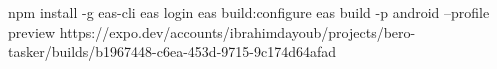 npm install -g eas-cli
eas login
eas build:configure
eas build -p android --profile preview
https://expo.dev/accounts/ibrahimdayoub/projects/bero-tasker/builds/b1967448-c6ea-453d-9715-9c174d64afad